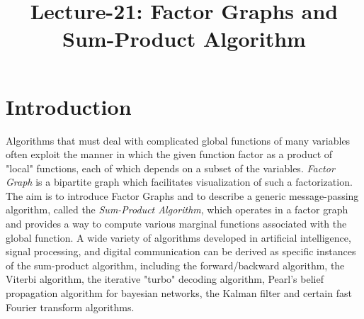 \documentclass[letterpaper,english,10pt]{article}
\title{Lecture-21: Factor Graphs and Sum-Product Algorithm}
\begin{document}
\maketitle

\section{Introduction}
Algorithms that must deal with complicated global functions of many variables often exploit the manner in which the given function factor as a
product of "local" functions, each of which depends on a subset of the variables. \textit{Factor Graph} is a bipartite graph which facilitates
visualization of such a factorization.\\ The aim is to introduce Factor Graphs and to describe a generic message-passing algorithm,
called the \textit{Sum-Product Algorithm}, which operates in a factor graph and provides a way to compute various marginal functions associated 
with the global function.
A wide variety of algorithms developed in artificial intelligence, signal processing, and digital communication can be derived as specific 
instances of the sum-product algorithm, including the forward/backward algorithm, the Viterbi algorithm, the iterative "turbo" decoding 
algorithm, Pearl's belief propagation algorithm for bayesian networks, the Kalman filter and certain fast Fourier transform algorithms.
\end{document}
